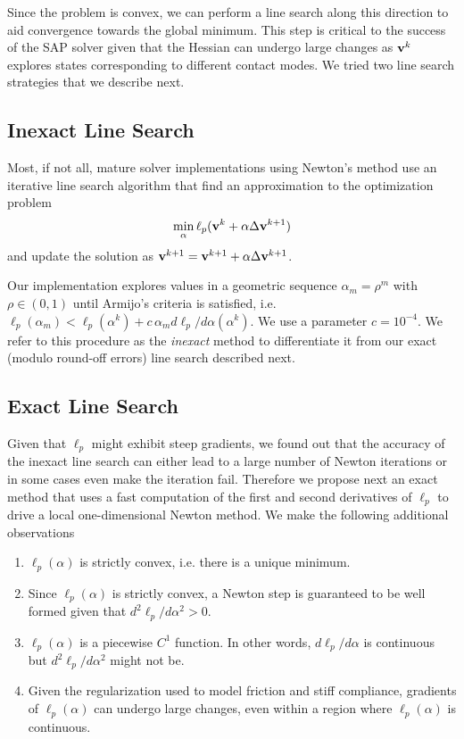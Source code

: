 Since the problem is convex, we can perform a line search along this
direction to aid convergence towards the global minimum. This step is critical
to the success of the SAP solver given that the Hessian can undergo large
changes as ${\mathbf{v}}^k$ explores states corresponding to different contact
modes. We tried two line search strategies that we describe next.

\subsection{Inexact Line Search}
Most, if not all, mature solver implementations using Newton's method use an
iterative line search algorithm that find an approximation to the optimization
problem
\begin{eqnarray}
	\min_{\alpha} \ell_p({\mathbf{v}}^k + \alpha \Delta{\mathbf{v}}^{k+1})
\end{eqnarray}
and update the solution as ${\mathbf{v}}^{k+1}={\mathbf{v}}^{k+1} + \alpha
\Delta{\mathbf{v}}^{k+1}$.

Our implementation explores values in a geometric sequence $\alpha_{m} = \rho^m$
with $\rho \in (0, 1)$ until Armijo's criteria is satisfied, i.e.
$\ell_p(\alpha_m) < \ell_p(\alpha^k) + c\,\alpha_m d\ell_p/d\alpha(\alpha^k)$.
We use a parameter $c=10^{-4}$. We refer to this procedure as the
\textit{inexact} method to differentiate it from our exact (modulo round-off
errors) line search described next.

\subsection{Exact Line Search}
Given that $\ell_p$ might exhibit steep gradients, we found out that the
accuracy of the inexact line search can either lead to a large number of Newton
iterations or in some cases even make the iteration fail.
Therefore we propose next an exact method that uses a fast computation of the
first and second derivatives of $\ell_p$ to drive a local one-dimensional Newton
method. We make the following additional observations
\begin{enumerate}
	\item $\ell_p(\alpha)$ is strictly convex, i.e. there is a unique minimum.
	\item Since $\ell_p(\alpha)$ is strictly convex, a Newton step is guaranteed
	to be well formed given that $d^2\ell_p/d\alpha^2>0$.
	\item $\ell_p(\alpha)$ is a piecewise $C^1$ function. In other words,
	$d\ell_p/d\alpha$ is continuous but $d^2\ell_p/d\alpha^2$ might not be.	
	\item Given the regularization used to model friction and stiff compliance,
	gradients of $\ell_p(\alpha)$ can undergo large changes, even within a
	region where $\ell_p(\alpha)$ is continuous.
\end{enumerate}

